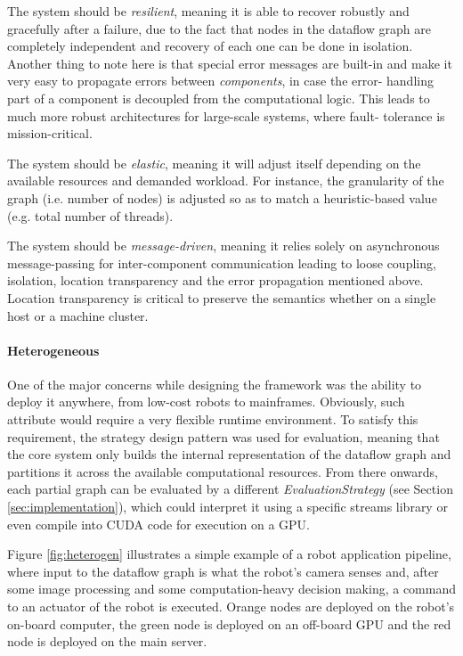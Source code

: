 \documentclass[sigplan,review,anonymous]{acmart}
\begin{document}
The system should be \textit{resilient}, meaning it is able to recover robustly
and gracefully after a failure, due to the fact that nodes in the dataflow graph
are completely independent and recovery of each one can be done in isolation.
Another thing to note here is that special error messages are built-in and make
it very easy to propagate errors between \textit{components}, in case the error-
handling part of a component is decoupled from the computational logic. This
leads to much more robust architectures for large-scale systems, where fault-
tolerance is mission-critical.

The system should be \textit{elastic}, meaning it will adjust itself depending
on the available resources and demanded workload. For instance, the granularity
of the graph (i.e. number of nodes) is adjusted so as to match a heuristic-based
value (e.g. total number of threads).

The system should be \textit{message-driven}, meaning it relies solely on
asynchronous message-passing for inter-component communication leading to loose
coupling, isolation, location transparency and the error propagation mentioned
above. Location transparency is critical to preserve the semantics whether on a
single host or a machine cluster.

\paragraph{Heterogeneous}
One of the major concerns while designing the framework was the ability to
deploy it anywhere, from low-cost robots to mainframes. Obviously, such
attribute would require a very flexible runtime environment. To satisfy this
requirement, the strategy design pattern was used for evaluation, meaning that
the core system only builds the internal representation of the dataflow graph
and partitions it across the available computational resources. From there
onwards, each partial graph can be evaluated by a different
\textit{EvaluationStrategy} (see Section \ref{sec:implementation}), which could
interpret it using a specific streams library or even compile into CUDA code for
execution on a GPU.

Figure \ref{fig:heterogen} illustrates a simple example of a robot application
pipeline, where input to the dataflow graph is what the robot's camera senses
and, after some image processing and some computation-heavy decision making, a
command to an actuator of the robot is executed. Orange nodes are deployed on
the robot's on-board computer, the green node is deployed on an off-board GPU
and the red node is deployed on the main server.
\end{document}
